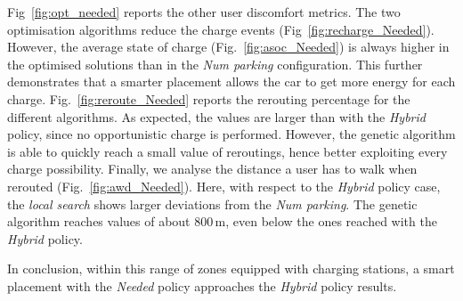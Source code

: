 \begin{figure}[t]
\end{figure}
 
Fig~\ref{fig:opt_needed} reports the other user discomfort metrics.
The two optimisation algorithms reduce the charge events (Fig~\ref{fig:recharge_Needed}).
However,  the average state of charge (Fig.~\ref{fig:asoc_Needed}) is always higher in the optimised solutions than in the \textit{Num parking} configuration. This further demonstrates that a smarter placement allows the car to get more energy for each charge.
Fig.~\ref{fig:reroute_Needed} reports the rerouting percentage for the different algorithms. As expected, the values are larger than with the \textit{Hybrid} policy, since no opportunistic charge is performed. 
However, the genetic algorithm is able to quickly reach a small value of reroutings, hence better exploiting every charge possibility. 
Finally, we analyse the distance a user has to walk when rerouted (Fig.~\ref{fig:awd_Needed}). Here, with respect to the \textit{Hybrid} policy case, the \textit{local search} shows larger deviations from the \textit{Num parking}. The genetic algorithm reaches values of about 800\,m, even below the ones reached with the \textit{Hybrid} policy.

In conclusion, within this range of zones equipped with charging stations, a smart placement with the \textit{Needed} policy approaches the \textit{Hybrid} policy results.  



 
 
 
 


